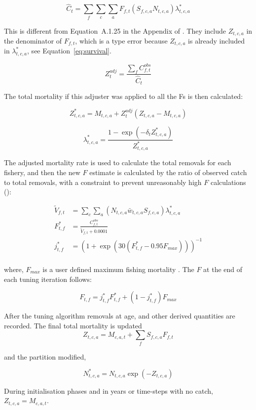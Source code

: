 \[
\widehat{C}_{t}  =  \sum\limits_f \sum\limits_c\sum\limits_a {F}_{f,t}\left(S_{f,c,a} N_{t,c,a}\right) \lambda^*_{t,c,a}
\]

This is different from Equation~A.1.25 in the Appendix of \citep{methot2013stock}. They include \(Z_{t,c,a}\) in the denominator of \({F}_{f,t}\), which is a type error because \(Z_{t,c,a}\) is already included in \(\lambda^*_{t,c,a}\), see Equation~\ref{eq:survival}.

\[
Z^{adj}_t = \frac{\sum\limits_f C^{obs}_{f,t}}{\widehat{C}_{t}}
\]

The total mortality if this adjuster was applied to all the Fs is then calculated:

\[
Z^*_{t,c,a} = M_{t,c,a} + Z^{adj}_t \left(Z_{t,c,a} -M_{t,c,a} \right)
\]

\[
\lambda^*_{t,c,a} = \frac{1 - \exp\left(-\delta_t Z^*_{t,c,a}  \right) }{Z^*_{t,c,a}}
\]

The adjusted mortality rate is used to calculate the total removals for each fishery, and then the new \(F\) estimate is calculated by the ratio of observed catch to total removals, with a constraint to prevent unreasonably high \(F\) calculations ():

\begin{align*}
	\tilde{V}_{f,t} &= \sum\limits_c\sum\limits_a \left(N_{t,c,a} \bar{w}_{t,c,a}S_{f,c,a} \right)\lambda^*_{t,c,a} \\
	F^*_{t,f} &= \frac{C^{obs}_{f,t}}{\tilde{V}_{f,t} + 0.0001}\\
	j^*_{t,f} &= \left(1 + \exp \left(30 (F^*_{t,f} - 0.95 F_{max}) \right)\right)^{-1}\\
\end{align*}

where, \(F_{max}\) is a user defined maximum fishing mortality . The \(F\) at the end of each tuning iteration follows: 

\[
F_{t,f} = j^*_{t,f} F^*_{t,f} + \left(1 - j^*_{t,f}\right)F_{max}
\]

After the tuning algorithm removals at age, and other derived quantities are recorded. The final total mortality is updated
\[
	Z_{t,c,a} = M_{c,a,t} + \sum\limits_{f} S_{f,c,a} F_{f,t}
\]

and the partition modified,

\[
N^*_{t,c,a} = N_{t,c,a} \exp\left(-Z_{t,c,a}\right)
\]

During initialisation phases and in years or time-steps with no catch, \(Z_{t,c,a} = M_{c,a,t}\).

